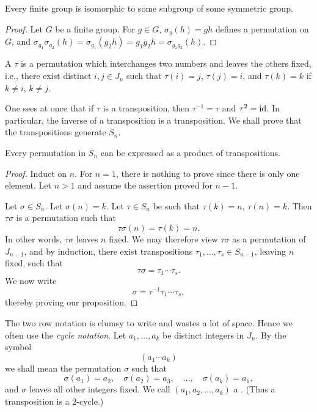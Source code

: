 \begin{theorem}
Every finite group is isomorphic to some subgroup of some symmetric group.
\end{theorem}

\begin{proof}
Let $G$ be a finite group.
For $g\in G$, $\sigma_g(h)=gh$ defines a permutation on $G$, and $\sigma_{g_1}\sigma_{g_2}(h)=\sigma_{g_1}(g_2 h)=g_1g_2h=\sigma_{g_1g_2}(h)$.
\end{proof}

A  $\tau$ is a permutation which interchanges two numbers and leaves the others fixed, i.e., there exist distinct $i,j\in J_n$ such that $\tau(i)=j$, $\tau(j)=i$, and $\tau(k)=k$ if $k\neq i$, $k\neq j$.

One sees at once that if $\tau$ is a transposition, then $\tau^{-1}=\tau$ and $\tau^2=\operatorname{id}$. 
In particular, the inverse of a transposition is a transposition.
We shall prove that the transpositions generate $S_n$.

\begin{proposition}
Every permutation in $S_n$ can be expressed as a product of transpositions.
\end{proposition}

\begin{proof}
Induct on $n$.
For $n=1$, there is nothing to prove since there is only one element.
Let $n>1$ and assume the assertion proved for $n-1$.

Let $\sigma\in S_n$. Let $\sigma(n)=k$. Let $\tau\in S_n$ be such that $\tau(k)=n$, $\tau(n)=k$. Then $\tau\sigma$ is a permutation such that
\[\tau\sigma(n)=\tau(k)=n.\]
In other words, $\tau\sigma$ leaves $n$ fixed. We may therefore view $\tau\sigma$ as a permutation of $J_{n-1}$, and by induction, there exist transpositions $\tau_1,\dots,\tau_s\in S_{n-1}$, leaving $n$ fixed, such that
\[\tau\sigma=\tau_1\cdots\tau_s.\]
We now write
\[\sigma=\tau^{-1}\tau_1\cdots\tau_s,\]
thereby proving our proposition.
\end{proof}

The two row notation is clumsy to write and wastes a lot of space. Hence we often use the \emph{cycle notation}. Let $a_1,\dots,a_k$ be distinct integers in $J_n$. By the symbol
\[(a_1\cdots a_k)\]
we shall mean the permutation $\sigma$ such that 
\[\sigma(a_1)=a_2,\quad\sigma(a_2)=a_3,\quad\dots,\quad\sigma(a_k)=a_1,\]
and $\sigma$ leaves all other integers fixed. We call $(a_1,a_2,\dots,a_k)$ a . (Thus a transposition is a $2$-cycle.)

